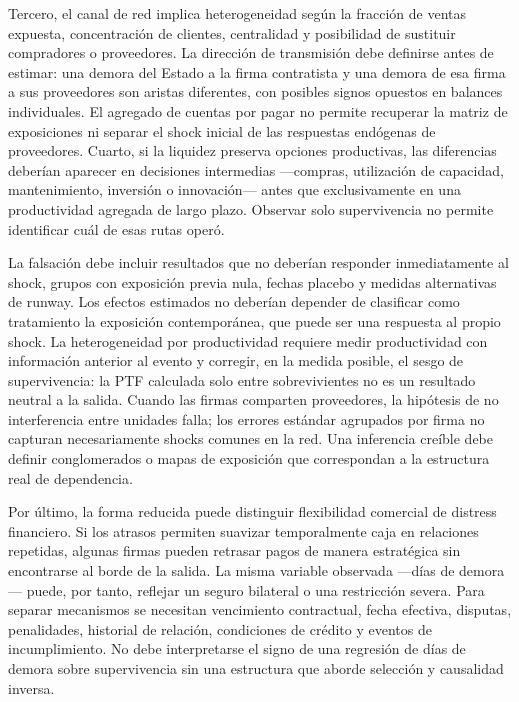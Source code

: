 \documentclass[11pt,a4paper]{article}
\begin{document}
Tercero, el canal de red implica heterogeneidad según la fracción de ventas expuesta, concentración de clientes, centralidad y posibilidad de sustituir compradores o proveedores. La dirección de transmisión debe definirse antes de estimar: una demora del Estado a la firma contratista y una demora de esa firma a sus proveedores son aristas diferentes, con posibles signos opuestos en balances individuales. El agregado de cuentas por pagar no permite recuperar la matriz de exposiciones ni separar el shock inicial de las respuestas endógenas de proveedores. Cuarto, si la liquidez preserva opciones productivas, las diferencias deberían aparecer en decisiones intermedias —compras, utilización de capacidad, mantenimiento, inversión o innovación— antes que exclusivamente en una productividad agregada de largo plazo. Observar solo supervivencia no permite identificar cuál de esas rutas operó.

La falsación debe incluir resultados que no deberían responder inmediatamente al shock, grupos con exposición previa nula, fechas placebo y medidas alternativas de runway. Los efectos estimados no deberían depender de clasificar como tratamiento la exposición contemporánea, que puede ser una respuesta al propio shock. La heterogeneidad por productividad requiere medir productividad con información anterior al evento y corregir, en la medida posible, el sesgo de supervivencia: la PTF calculada solo entre sobrevivientes no es un resultado neutral a la salida. Cuando las firmas comparten proveedores, la hipótesis de no interferencia entre unidades falla; los errores estándar agrupados por firma no capturan necesariamente shocks comunes en la red. Una inferencia creíble debe definir conglomerados o mapas de exposición que correspondan a la estructura real de dependencia.

Por último, la forma reducida puede distinguir flexibilidad comercial de distress financiero. Si los atrasos permiten suavizar temporalmente caja en relaciones repetidas, algunas firmas pueden retrasar pagos de manera estratégica sin encontrarse al borde de la salida. La misma variable observada —días de demora— puede, por tanto, reflejar un seguro bilateral o una restricción severa. Para separar mecanismos se necesitan vencimiento contractual, fecha efectiva, disputas, penalidades, historial de relación, condiciones de crédito y eventos de incumplimiento. No debe interpretarse el signo de una regresión de días de demora sobre supervivencia sin una estructura que aborde selección y causalidad inversa.
\end{document}
